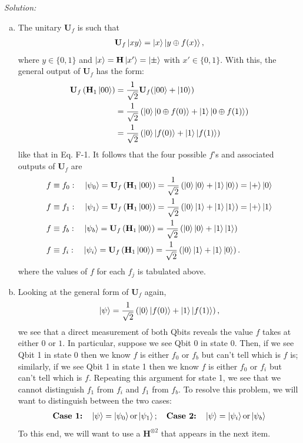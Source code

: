 \documentclass{book}
\theoremstyle{definition}
\newcommand{\nn}{\nonumber}
\newcommand{\f}[2]{\frac{#1}{#2}}
\newcommand{\lp}{\left(}
\newcommand{\rp}{\right)}
\newcommand{\had}{\mathbf{H}}
\begin{document}
\noindent \textit{Solution:} 
\begin{enumerate}[(a)]
	\item The unitary $\mathbf{U}_f$ is such that
	\begin{align}
	\mathbf{U}_f \ket{xy} = \ket{x}\ket{y\oplus f(x)},
	\end{align}
	where $y\in \{0,1\}$ and $\ket{x} = \had\ket{x'} = \ket{\pm}$ with $x' \in \{0,1\}$. With this, the general output of $\mathbf{U}_f$ has the form:
	\begin{align}
	\mathbf{U}_f\lp \had_1\ket{00} \rp 
	&= \f{1}{\sqrt{2}}\mathbf{U}_f(\ket{00}+\ket{10})\nn\\
	&= \f{1}{\sqrt{2}}\lp \ket{0}\ket{0\oplus f(0)} + \ket{1}\ket{0\oplus f(1)} \rp\nn\\
	&= \frac{1}{\sqrt{2}}\lp \ket{0}\ket{f(0)} + \ket{1}\ket{f(1)} \rp
	\end{align}
	like that in Eq. F-1. It follows that the four possible $f$'s and associated outputs of $\mathbf{U}_f$ are
	\begin{align}
	&f \equiv f_0: \quad \ket{\psi_0} = \mathbf{U}_f\lp \had_1\ket{00} \rp 
	= \f{1}{\sqrt{2}}\lp \ket{0}\ket{0} + \ket{1}\ket{0} \rp 
	= \ket{+}\ket{0} \nn\\
	&f \equiv f_1: \quad \ket{\psi_1} = \mathbf{U}_f\lp \had_1\ket{00} \rp 
	= \f{1}{\sqrt{2}}\lp \ket{0}\ket{1} + \ket{1}\ket{1} \rp 
	= \ket{+}\ket{1} \nn\\
	&f \equiv f_b: \quad \ket{\psi_b} = \mathbf{U}_f\lp \had_1\ket{00} \rp 
	=  \f{1}{\sqrt{2}}\lp \ket{0}\ket{0} + \ket{1}\ket{1} \rp\nn\\
	&f \equiv f_i: \quad \ket{\psi_i} = \mathbf{U}_f\lp \had_1\ket{00}\rp 
	=  \f{1}{\sqrt{2}}\lp \ket{0}\ket{1} + \ket{1}\ket{0} \rp.
	\end{align}
	where the values of $f$ for each $f_j$ is tabulated above. 
	
	
	\item Looking at the general form of $\mathbf{U}_f$ again,
	\begin{align}
	\ket{\psi} = \f{1}{\sqrt{2}}\lp \ket{0}\ket{f(0)} + \ket{1}\ket{f(1)} \rp,
	\end{align}
	we see that a direct measurement of both Qbits reveals the value $f$ takes at either $0$ or $1$. In particular, suppose we see Qbit 0 in state 0. Then, if we see Qbit 1 in state 0 then we know $f$ is either $f_0$ or $f_b$ but can't tell which is $f$ is; similarly, if we see Qbit 1 in state 1 then we know $f$ is either $f_0$ or $f_i$ but can't tell which is $f$. Repeating this argument for state 1, we see that we cannot distinguish $f_1$ from $f_i$ and $f_1$ from $f_b$. To resolve this problem, we will want to distinguish between the two cases:
	\begin{align}
	\mbox{\textbf{Case 1:}}\quad \ket{\psi} = \ket{\psi_0} \mbox{or} \ket{\psi_1};\quad 	\mbox{\textbf{Case 2:}}\quad \ket{\psi} = \ket{\psi_i} \mbox{or} \ket{\psi_b}
	\end{align} 
	To this end, we will want to use a $\had^{\otimes 2}$ that appears in the next item. 
		

\end{enumerate}
\end{document}
